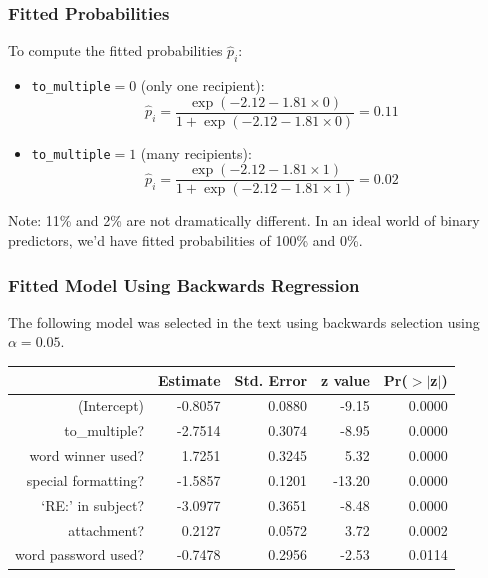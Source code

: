 \documentclass[handout]{beamer}
\begin{document}
\begin{frame}[fragile]
\frametitle{Fitted Probabilities}
%
%
To compute the fitted probabilities $\widehat{p}_i$:
\begin{itemize}
\item {\tt to\_multiple}$ = 0$ (only one recipient):
\[
\widehat{p}_i = \frac{\exp(-2.12 - 1.81 \times 0)}{1 + \exp(-2.12 - 1.81 \times 0)} = 0.11
\]
\item {\tt to\_multiple}$ = 1$ (many recipients):
\[
\widehat{p}_i = \frac{\exp(-2.12 - 1.81 \times 1)}{1 + \exp(-2.12 - 1.81 \times 1)} = 0.02
\]
\end{itemize}
\pause
Note:  11\% and 2\% are not dramatically different.  In an ideal world of binary predictors, we'd have fitted probabilities of 100\% and 0\%.
\end{frame}


\begin{frame}[fragile]
\frametitle{Fitted Model Using Backwards Regression}
The following model was selected in the text using backwards selection using $\alpha=0.05$.

\begin{table}[ht]
\centering
\begin{tabular}{r|rrrr}
  \hline
 & Estimate & Std. Error & z value & Pr($>$$|$z$|$) \\ 
  \hline
(Intercept) & -0.8057 & 0.0880 & -9.15 & 0.0000 \\ 
  to\_multiple? & -2.7514 & 0.3074 & -8.95 & 0.0000 \\ 
  word winner used? & 1.7251 & 0.3245 & 5.32 & 0.0000 \\ 
  special formatting? & -1.5857 & 0.1201 & -13.20 & 0.0000 \\ 
  `RE:' in subject? & -3.0977 & 0.3651 & -8.48 & 0.0000 \\ 
  attachment? & 0.2127 & 0.0572 & 3.72 & 0.0002 \\ 
  word password used? & -0.7478 & 0.2956 & -2.53 & 0.0114 \\ 
   \hline
\end{tabular}
\end{table} 

\end{frame}
\end{document}
